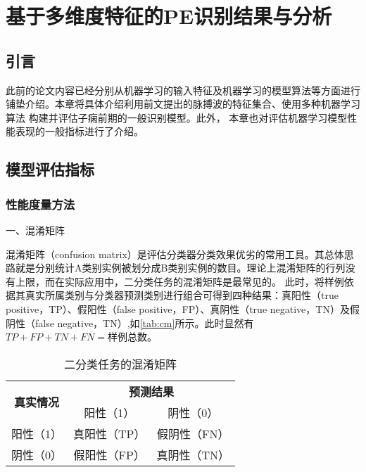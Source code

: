 \chapter{基于多维度特征的PE识别结果与分析}
\section{引言}
此前的论文内容已经分别从机器学习的输入特征及机器学习的模型算法等方面进行铺垫介绍。本章将具体介绍利用前文提出的脉搏波的特征集合、使用多种机器学习算法
构建并评估子痫前期的一般识别模型。此外， 本章也对评估机器学习模型性能表现的一般指标进行了介绍。
\section{模型评估指标}
\subsection{性能度量方法}
一、混淆矩阵

混淆矩阵（confusion matrix）是评估分类器分类效果优劣的常用工具\cite{Zhou2016,Aurélien2018}。其总体思路就是分别统计A类别实例被划分成B类别实例的数目。理论上混淆矩阵的行列没有上限，而在实际应用中，二分类任务的混淆矩阵是最常见的。
此时，将样例依据其真实所属类别与分类器预测类别进行组合可得到四种结果：真阳性（true positive，TP）、假阳性（false positive，FP）、真阴性（true negative，TN）及假阴性（false negative，TN）,如\autoref{tab:cm}所示。此时显然有
$TP+FP+TN+FN=\text{样例总数}$。
\begin{table}[htbp]
      \centering
      \caption{\label{tab:cm}二分类任务的混淆矩阵}
      \begin{tabular}{ccc}
      \toprule
      \multicolumn{1}{c}{\multirow{2}[4]{*}{\textbf{真实情况}}} & \multicolumn{2}{c}{\textbf{预测结果}} \\
            \cmidrule{2-3}          & 阳性（1） & 阴性（0） \\
      \midrule
      阳性（1） & 真阳性（TP） & 假阴性（FN） \\
      阴性（0） & 假阳性（FP） & 真阴性（TN） \\
      \bottomrule
      \end{tabular}%
\end{table}%

